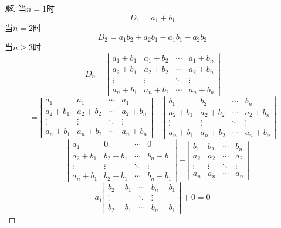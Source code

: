 \documentclass[10pt,a4paper]{report}
\begin{document}
\begin{proof}[解]
	当$n = 1$时\\
	$$D_{1} = a_{1}+b_{1}$$
	当$n = 2$时\\
	$$D_{2} = a_{1}b_{2}+a_{2}b_{1}-a_{1}b_{1}-a_{2}b_{2}$$
	当$n \geq 3$时\\
	$$D_{n}= \left|
	\begin{matrix}
	a_{1}+b_{1} & a_{1}+b_{2} & \cdots & a_{1}+b_{n}\\
	a_{2}+b_{1} & a_{2}+b_{2} & \cdots & a_{2}+b_{n}\\
	\vdots & \vdots & \ddots & \vdots\\
	a_{n}+b_{1} & a_{n}+b_{2} & \cdots & a_{n}+b_{n}
	\end{matrix}
	\right|$$
	$$
	=\left|
	\begin{matrix}
	a_{1} & a_{1} & \cdots & a_{1}\\
	a_{2}+b_{1} & a_{2}+b_{2} & \cdots & a_{2}+b_{n}\\
	\vdots & \vdots & \ddots & \vdots\\
	a_{n}+b_{1} & a_{n}+b_{2} & \cdots & a_{n}+b_{n}
	\end{matrix}
	\right|+\left|
	\begin{matrix}
	b_{1} & b_{2} & \cdots & b_{n}\\
	a_{2}+b_{1} & a_{2}+b_{2} & \cdots & a_{2}+b_{n}\\
	\vdots & \vdots & \ddots & \vdots\\
	a_{n}+b_{1} & a_{n}+b_{2} & \cdots & a_{n}+b_{n}
	\end{matrix}
	\right|
	$$
	$$
	=\left|
	\begin{matrix}
	a_{1} & 0 & \cdots & 0\\
	a_{2}+b_{1} & b_{2}-b_{1} & \cdots & b_{n}-b_{1}\\
	\vdots & \vdots & \ddots & \vdots\\
	a_{n}+b_{1} & b_{2}-b_{1} & \cdots & b_{n}-b_{1}
	\end{matrix}
	\right|+\left|
	\begin{matrix}
	b_{1} & b_{2} & \cdots & b_{n}\\
	a_{2} & a_{2} & \cdots & a_{2}\\
	\vdots & \vdots & \ddots & \vdots\\
	a_{n} & a_{n} & \cdots & a_{n}
	\end{matrix}
	\right|
	$$
	$$
	a_{1}\left|
	\begin{matrix}
	b_{2}-b_{1} & \cdots & b_{n}-b_{1}\\
	\vdots & \ddots & \vdots\\
	b_{2}-b_{1} & \cdots & b_{n}-b_{1}
	\end{matrix}
	\right|+0=0
	$$
\end{proof}
\end{document}
